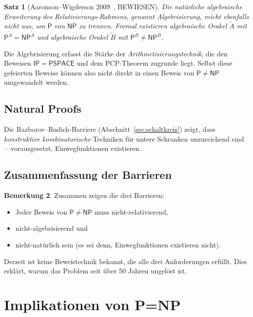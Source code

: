 \documentclass[12pt,a4paper]{amsart}
\newtheorem{theorem}{Satz}[section]
\theoremstyle{definition}
\newtheorem{remark}[theorem]{Bemerkung}
\newcommand{\Pclass}{\mathsf{P}}
\newcommand{\NP}{\mathsf{NP}}
\newcommand{\PSPACE}{\mathsf{PSPACE}}
\begin{document}
\begin{theorem}[Aaronson--Wigderson 2009~\cite{aaronson2009}, BEWIESEN]
Die natürliche \emph{algebraische Erweiterung} des Relativierungs-Rahmens,
genannt \emph{Algebrisierung}, reicht ebenfalls nicht aus, um $\Pclass$ von
$\NP$ zu trennen.  Formal existieren algebraische Orakel $\tilde{A}$ mit
$\Pclass^{\tilde{A}} = \NP^{\tilde{A}}$ und algebraische Orakel $\tilde{B}$
mit $\Pclass^{\tilde{B}} \neq \NP^{\tilde{B}}$.
\end{theorem}

Die Algebrisierung erfasst die Stärke der \emph{Arithmetisierungstechnik},
die den Beweisen $\mathsf{IP}=\PSPACE$ und dem PCP-Theorem zugrunde liegt.
Selbst diese gefeierten Beweise können also nicht direkt in einen Beweis
von $\Pclass\neq\NP$ umgewandelt werden.

\subsection{Natural Proofs}

Die Razborov--Rudich-Barriere (Abschnitt~\ref{sec:schaltkreis}) zeigt, dass
\emph{konstruktive kombinatorische} Techniken für untere Schranken
unzureichend sind---vorausgesetzt, Einwegfunktionen existieren.

\subsection{Zusammenfassung der Barrieren}

\begin{remark}
Zusammen zeigen die drei Barrieren:
\begin{itemize}
  \item Jeder Beweis von $\Pclass\neq\NP$ muss nicht-relativierend,
  \item nicht-algebrisierend und
  \item nicht-natürlich sein (es sei denn, Einwegfunktionen existieren nicht).
\end{itemize}
Derzeit ist keine Beweistechnik bekannt, die alle drei Anforderungen erfüllt.
Dies erklärt, warum das Problem seit über 50 Jahren ungelöst ist.
\end{remark}

\section{Implikationen von P=NP}
\label{sec:implikationen}
\end{document}
